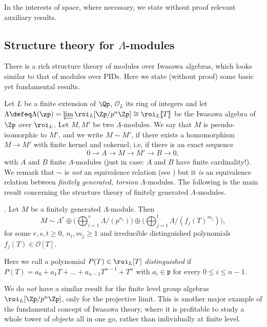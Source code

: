 \documentclass[a4paper,10pt, english, reqno]{smfart}
\newcommand{\lsem}{[\! [}
\newcommand{\rsem}{]\! ]}
\numberwithin{equation}{section}
\begin{document}
 In the interests of space, where necessary, we state without proof relevant auxiliary results.
 



\subsection{Structure theory for $\Lambda$-modules}\label{sec:structure theorems}

There is a rich structure theory of modules over Iwasawa algebras, which looks similar to that of modules over PIDs. Here we state (without proof) some basic yet fundamental results. 

Let $L$ be a finite extension of $\Qp$, $\mathscr{O}_L$ its ring of integers and let $\Lambda \defeq \Lambda(\zp) = \varprojlim \roi_L[\Zp/p^n\Zp] \cong \roi_L\lsem T\rsem$ be the Iwasawa algebra of $\Zp$ over $\roi_L$. Let $M, M'$ be two $\Lambda$-modules. We say that $M$ is pseudo-isomorphic to $M'$, and we write $M \sim M'$, if there exists a homomorphism $M \rightarrow M'$ with finite kernel and cokernel, i.e, if there is an exact sequence
 \[
  0 \to A \to M \to M' \to B \to 0, 
  \] 
 with $A$ and $B$ finite $\Lambda$-modules (just in case: $A$ and $B$ have finite cardinality!). We remark that $\sim$ is \emph{not} an equivalence relation (see \cite[Warning, \S13.2]{Washington2}) but it \emph{is} an equivalence relation between \emph{finitely generated, torsion} $\Lambda$-modules. The following is the main result concerning the structure theory of finitely generated $\Lambda$-modules.

\begin{theorem} \label{thm:structure theorem} \cite[Thm.\ 13.12]{Washington2}. Let $M$ be a finitely generated $\Lambda$-module. Then
	\[
	 M \sim \Lambda^r \oplus \bigg( \bigoplus_{i = 1}^s \Lambda / (p^{n_i}) \bigg) \oplus \bigg( \bigoplus_{j = 1}^t \Lambda / (f_j(T)^{m_j}) \bigg), 
	 \]
	for some $r, s, t \geq 0$, $n_i, m_j \geq 1$ and irreducible distinguished polynomials $f_j(T) \in \mathscr{O}[T]$.
\end{theorem}

	Here we call a polynomial $P(T) \in \roi_L[T]$ \emph{distinguished} if $P(T) = a_0 + a_1 T + \hdots + a_{n-1} T^{n - 1} + T^n$ with $a_i \in \mathfrak{p}$ for every $0 \leq i \leq n - 1$.



\begin{remark}
	We do \emph{not} have a similar result for the finite level group algebras $\roi_L[\Zp/p^n\Zp]$, only for the projective limit. This is another major example of the fundamental concept of Iwasawa theory, where it is profitable to study a whole tower of objects all in one go, rather than individually at finite level. %
\end{remark}
\end{document}
